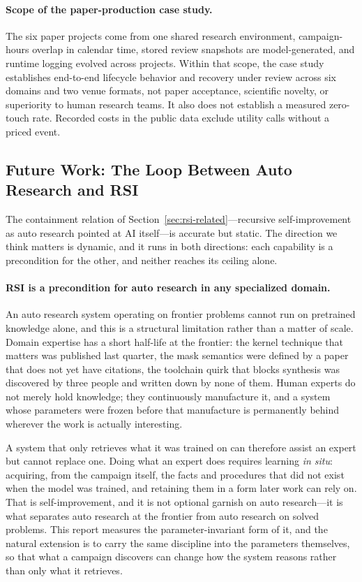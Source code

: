 \paragraph{Scope of the paper-production case study.}
The six paper projects come from one shared research environment, campaign-hours
overlap in calendar time, stored review snapshots are model-generated, and runtime
logging evolved across projects. Within that scope, the case study establishes
end-to-end lifecycle behavior and recovery under review across six domains and two
venue formats, not paper acceptance, scientific novelty, or superiority to human
research teams. It also does not establish a measured zero-touch rate. Recorded
costs in the public data exclude utility calls without a priced event.

\subsection{Future Work: The Loop Between Auto Research and RSI}

The containment relation of Section~\ref{sec:rsi-related}---recursive
self-improvement as auto research pointed at AI itself---is accurate but static. The
direction we think matters is dynamic, and it runs in both directions: each capability
is a precondition for the other, and neither reaches its ceiling alone.

\paragraph{RSI is a precondition for auto research in any specialized domain.}
An auto research system operating on frontier problems cannot run on pretrained
knowledge alone, and this is a structural limitation rather than a matter of scale.
Domain expertise has a short half-life at the frontier: the kernel technique that
matters was published last quarter, the mask semantics were defined by a paper that
does not yet have citations, the toolchain quirk that blocks synthesis was discovered
by three people and written down by none of them. Human experts do not merely hold
knowledge; they continuously manufacture it, and a system whose parameters were
frozen before that manufacture is permanently behind wherever the work is actually
interesting.

A system that only retrieves what it was trained on can therefore assist an expert
but cannot replace one. Doing what an expert does requires learning \emph{in situ}:
acquiring, from the campaign itself, the facts and procedures that did not exist when
the model was trained, and retaining them in a form later work can rely on. That is
self-improvement, and it is not optional garnish on auto research---it is what
separates auto research at the frontier from auto research on solved problems. This
report measures the parameter-invariant form of it, and the natural extension is to
carry the same discipline into the parameters themselves, so that what a campaign
discovers can change how the system reasons rather than only what it retrieves.


